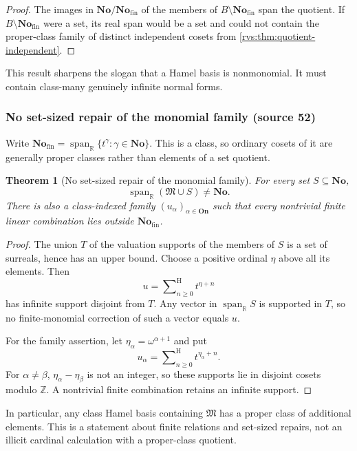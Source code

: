 \documentclass[11pt,letterpaper]{article}
\numberwithin{equation}{section}
\newtheorem{theorem}{Theorem}[section]
\newtheorem{corollary}[theorem]{Corollary}
\theoremstyle{definition}
\theoremstyle{remark}
\newcommand{\No}{\mathbf{No}}
\newcommand{\On}{\mathbf{On}}
\newcommand{\R}{\mathbb{R}}
\newcommand{\Z}{\mathbb{Z}}
\newcommand{\M}{\mathfrak{M}}
\newcommand{\Fin}{\No_{\mathrm{fin}}}
\newcommand{\Span}{\operatorname{span}}
\newcommand{\hSum}{\mathop{\sum}\nolimits^{\mathrm H}}
\begin{document}

\begin{proof}
The images in \(\No/\Fin\) of the members of \(B\setminus\Fin\) span the
quotient.  If \(B\setminus\Fin\) were a set, its real span would be a set and
could not contain the proper-class family of distinct independent cosets from
\cref{rvs:thm:quotient-independent}.
\end{proof}

This result sharpens the slogan that a Hamel basis is nonmonomial.  It must
contain class-many genuinely infinite normal forms.

\subsubsection*{No set-sized repair of the monomial family (source 52)}

Write $\Fin=\Span_\R\{t^\gamma:\gamma\in\No\}$. This is a class, so ordinary cosets of it are generally proper classes rather than elements of a set quotient.

\begin{theorem}[No set-sized repair of the monomial family]\label{rvs:eu:thm:classdefect}
For every set $S\subseteq\No$,
\[
 \Span_\R(\M\cup S)\ne\No.
\]
There is also a class-indexed family $(u_\alpha)_{\alpha\in\On}$ such that every nontrivial finite linear combination lies outside $\Fin$.
\end{theorem}
\begin{proof}
The union $T$ of the valuation supports of the members of $S$ is a set of surreals, hence has an upper bound. Choose a positive ordinal $\eta$ above all its elements. Then
\[
 u=\hSum_{n\ge0}t^{\eta+n}
\]
has infinite support disjoint from $T$. Any vector in $\Span_\R S$ is supported in $T$, so no finite-monomial correction of such a vector equals $u$.

For the family assertion, let $\eta_\alpha=\omega^{\alpha+1}$ and put
\[
 u_\alpha=\hSum_{n\ge0}t^{\eta_\alpha+n}.
\]
For $\alpha\ne\beta$, $\eta_\alpha-\eta_\beta$ is not an integer, so these supports lie in disjoint cosets modulo $\Z$. A nontrivial finite combination retains an infinite support.
\end{proof}
In particular, any class Hamel basis containing $\M$ has a proper class of additional elements. This is a statement about finite relations and set-sized repairs, not an illicit cardinal calculation with a proper-class quotient.
\end{document}
